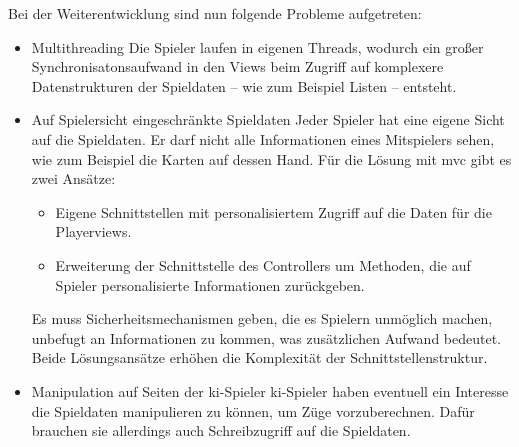 \documentclass[
							a4paper, 
							11pt, 
							openany, 
							liststotoc,
							parskip=half, 
   							headings=normal
						]{scrreprt}
\begin{document}
{Bei der Weiterentwicklung sind nun folgende Probleme aufgetreten:
\begin{itemize}
	\item Multithreading\newline
Die Spieler laufen in eigenen Threads, wodurch ein großer Synchronisatonsaufwand in den Views beim Zugriff auf komplexere Datenstrukturen der Spieldaten -- wie zum Beispiel Listen -- entsteht.
	\item Auf Spielersicht eingeschränkte Spieldaten\newline
Jeder Spieler hat eine eigene Sicht auf die Spieldaten. Er darf nicht alle Informationen eines Mitspielers sehen, wie zum Beispiel die Karten auf dessen Hand. Für die Lösung mit \acs{mvc} gibt es zwei Ansätze: 
\begin{itemize}
	\item Eigene Schnittstellen mit personalisiertem Zugriff auf die Daten für die Playerviews.
	\item Erweiterung der Schnittstelle des Controllers um Methoden, die auf Spieler personalisierte Informationen zurückgeben.
\end{itemize}
Es muss Sicherheitsmechanismen geben, die es Spielern unmöglich machen, unbefugt an Informationen zu kommen, was zusätzlichen Aufwand bedeutet. Beide Lösungsansätze erhöhen die Komplexität der Schnittstellenstruktur.
	\item Manipulation auf Seiten der \acs{ki}-Spieler\newline
\acs{ki}-Spieler haben eventuell ein Interesse die Spieldaten manipulieren zu können, um Züge vorzuberechnen. Dafür brauchen sie allerdings auch Schreibzugriff auf die Spieldaten.
\end{itemize}

}
\end{document}

